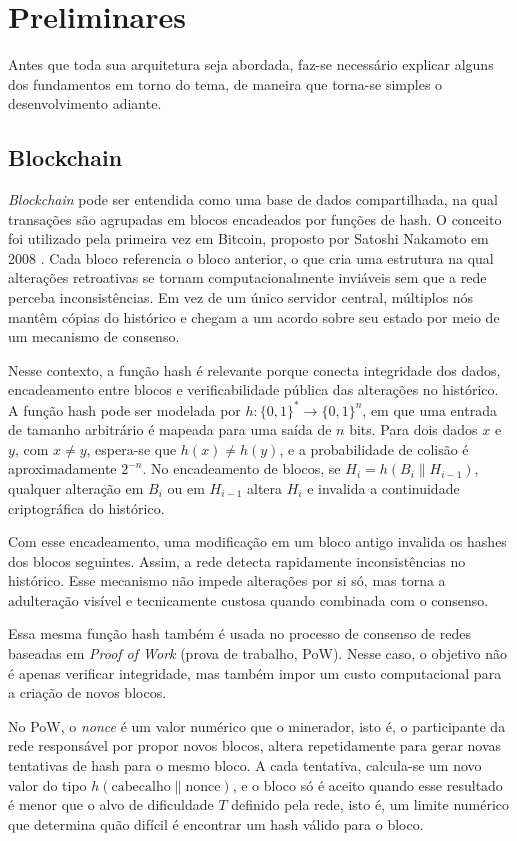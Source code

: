 \section{Preliminares}

Antes que toda sua arquitetura seja abordada, faz-se necessário explicar alguns dos fundamentos
em torno do tema, de maneira que torna-se simples o desenvolvimento adiante.

\subsection{Blockchain}

\emph{Blockchain} pode ser entendida como uma base de dados compartilhada, na qual transações são
agrupadas em blocos encadeados por funções de hash. O conceito foi utilizado pela
primeira vez em Bitcoin, proposto por Satoshi Nakamoto em 2008 \cite{nakamoto2008bitcoin}. Cada bloco referencia o bloco anterior,
o que cria uma estrutura na qual alterações retroativas se tornam computacionalmente inviáveis sem que
a rede perceba inconsistências. Em vez de um único servidor central, múltiplos nós
mantêm cópias do histórico e chegam a um acordo sobre seu estado por meio de um
mecanismo de consenso.

Nesse contexto, a função hash é relevante porque conecta integridade dos dados,
encadeamento entre blocos e verificabilidade pública das alterações no histórico.
A função hash pode ser modelada por $h: \{0,1\}^* \to \{0,1\}^n$, em que uma entrada de
tamanho arbitrário é mapeada para uma saída de $n$ bits. Para dois dados $x$ e $y$, com $x \neq y$,
espera-se que $h(x) \neq h(y)$, e a probabilidade de colisão é aproximadamente $2^{-n}$.
No encadeamento de blocos, se $H_i = h(B_i \| H_{i-1})$, qualquer alteração em $B_i$ ou em
$H_{i-1}$ altera $H_i$ e invalida a continuidade criptográfica do histórico.

Com esse encadeamento, uma modificação em um bloco antigo invalida os hashes dos blocos
seguintes. Assim, a rede detecta rapidamente inconsistências no histórico. Esse mecanismo
não impede alterações por si só, mas torna a adulteração visível e tecnicamente custosa
quando combinada com o consenso.

Essa mesma função hash também é usada no processo de consenso de redes baseadas em
\emph{Proof of Work} (prova de trabalho, PoW). Nesse caso, o objetivo não é apenas verificar integridade, mas
também impor um custo computacional para a criação de novos blocos.

No PoW, o \emph{nonce} é um valor numérico que o minerador, isto é, o participante da rede
responsável por propor novos blocos, altera repetidamente para gerar
novas tentativas de hash para o mesmo bloco. A cada tentativa, calcula-se um novo valor
do tipo $h(\text{cabecalho} \| \text{nonce})$, e o bloco só é aceito quando esse resultado é menor que
o alvo de dificuldade $T$ definido pela rede, isto é, um limite numérico que determina
quão difícil é encontrar um hash válido para o bloco.

